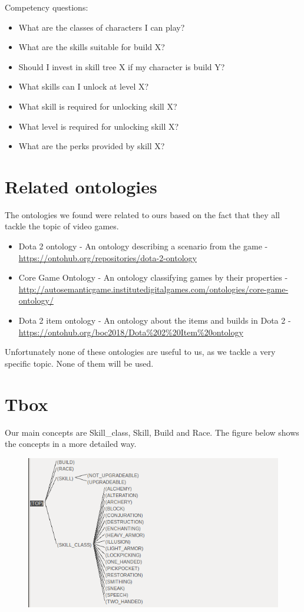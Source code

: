 \documentclass[a4paper,12pt]{report}
\begin{document}
\hfill \break
Competency questions:

\begin{itemize}
\item What are the classes of characters I can play?
\item What are the skills suitable for build X?
\item Should I invest in skill tree X if my character is build Y?
\item What skills can I unlock at level X?
\item What skill is required for unlocking skill X?
\item What level is required for unlocking skill X?
\item What are the perks provided by skill X?
\end{itemize}


\clearpage
\section{Related ontologies}
The ontologies we found were related to ours based on the fact that they all tackle the topic of video games.

\begin{itemize}
\item Dota 2 ontology - An ontology describing a scenario from the game - \url{https://ontohub.org/repositories/dota-2-ontology}
\item Core Game Ontology - An ontology classifying games by their properties - \url{http://autosemanticgame.institutedigitalgames.com/ontologies/core-game-ontology/}
\item Dota 2 item ontology - An ontology about the items and builds in Dota 2 - \url{https://ontohub.org/boc2018/Dota\%202\%20Item\%20ontology}
\end{itemize}

Unfortunately none of these ontologies are useful to us, as we tackle a very specific topic. None of them will be used.


\clearpage
\section{Tbox}
Our main concepts are Skill\_class, Skill, Build and Race. The figure below shows the concepts in a more detailed way.

\begin{figure}[h]
\includegraphics[scale=0.65]{taxonomy}
\end{figure}
\end{document}
